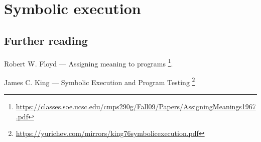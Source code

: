 \chapter{Symbolic execution}




\section{Further reading}

Robert W. Floyd --- Assigning meaning to programs
\footnote{\url{https://classes.soe.ucsc.edu/cmps290g/Fall09/Papers/AssigningMeanings1967.pdf}}.

James C. King --- Symbolic Execution and Program Testing
\footnote{\url{https://yurichev.com/mirrors/king76symbolicexecution.pdf}}

